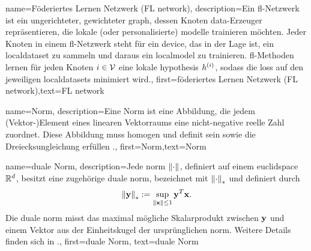 {{{{
{
	name={Föderiertes Lernen Netzwerk (FL network)},
	description={Ein \gls{fl}-Netzwerk ist ein ungerichteter, gewichteter \gls{graph}, dessen Knoten \gls{data}-Erzeuger repräsentieren, die lokale (oder personalisierte) \gls{modelle} trainieren möchten. Jeder Knoten in einem \gls{fl}-Netzwerk steht für ein \gls{device}, das in der Lage ist, ein \gls{localdataset} zu sammeln und daraus ein \gls{localmodel} zu trainieren. \Gls{fl}-Methoden lernen für jeden Knoten $i \in \mathcal{V}$ eine lokale \gls{hypothesis} $h^{(i)}$, sodass die \gls{loss} auf den jeweiligen \gls{localdataset}s minimiert wird.},
	first={föderiertes Lernen Netzwerk (FL network)},text={FL network} 
}


{
	name={Norm},
	description={Eine  Norm ist eine Abbildung, die jedem (Vektor-)Element eines linearen Vektorraums eine nicht-negative reelle Zahl zuordnet. Diese Abbildung muss homogen und definit sein sowie die Dreiecksungleichung erfüllen \cite{HornMatAnalysis}.},
	first={Norm},text={Norm} 
}


{
	name={duale Norm},
	description={Jede \gls{norm} $\normgeneric{\cdot}{}$, definiert auf einem \gls{euclidspace} $\mathbb{R}^{d}$, besitzt eine zugehörige duale \gls{norm}, bezeichnet mit $\normgeneric{\cdot}{*}$ und definiert durch
		\[
		\normgeneric{\vy}{*} \defeq \sup_{\norm{\vx}{} \leq 1} \vy^{T} \vx.
		\]
		Die duale \gls{norm} misst das maximal mögliche Skalarprodukt zwischen ${\bf y}$ und einem Vektor aus der Einheitskugel der ursprünglichen \gls{norm}. Weitere Details finden sich in \cite[Abschnitt A.1.6]{BoydConvexBook}.},
	first={duale Norm},
	text={duale Norm}
}

}}}}
